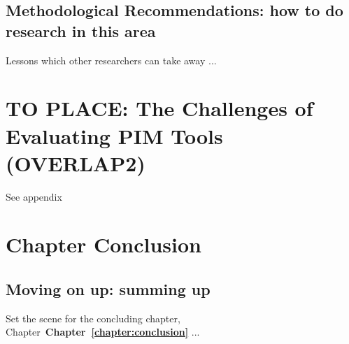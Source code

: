 \subsection{Methodological Recommendations: how to do research in this area}

Lessons which other researchers can take away ...





\section{TO PLACE: The Challenges of Evaluating PIM Tools (OVERLAP2)}

See appendix


	

\section{Chapter Conclusion}
\label{ch7:chapter-summary}

\subsection{Moving on up: summing up}

Set the scene for the concluding chapter, Chapter~\textbf{Chapter~\ref{chapter:conclusion}} ...


